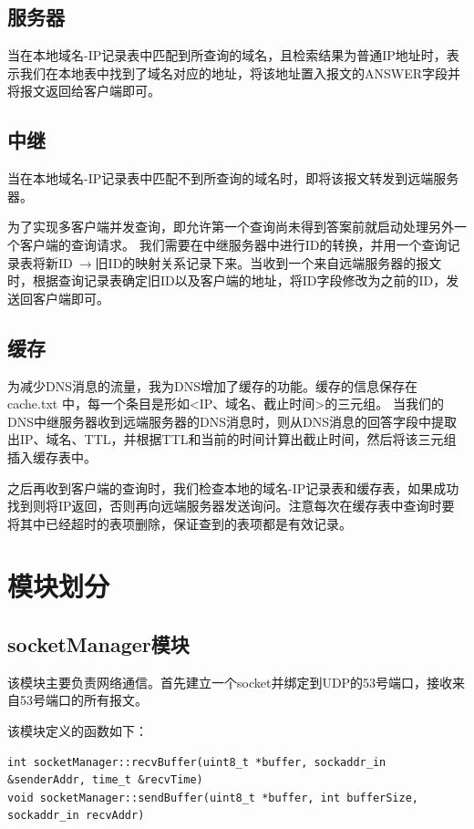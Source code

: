 \documentclass[]{article}
\begin{document}
    \subsection{服务器}
        当在本地域名-IP记录表中匹配到所查询的域名，且检索结果为普通IP地址时，表示我们在本地表中找到了域名对应的地址，将该地址置入报文的ANSWER字段并将报文返回给客户端即可。
    \subsection{中继}
        当在本地域名-IP记录表中匹配不到所查询的域名时，即将该报文转发到远端服务器。

        为了实现多客户端并发查询，即允许第一个查询尚未得到答案前就启动处理另外一个客户端的查询请求。
        我们需要在中继服务器中进行ID的转换，并用一个查询记录表将新ID$\ \to$旧ID的映射关系记录下来。当收到一个来自远端服务器的报文时，根据查询记录表确定旧ID以及客户端的地址，将ID字段修改为之前的ID，发送回客户端即可。
    \subsection{缓存}
        为减少DNS消息的流量，我为DNS增加了缓存的功能。缓存的信息保存在 cache.txt 中，每一个条目是形如<IP、域名、截止时间>的三元组。
        当我们的DNS中继服务器收到远端服务器的DNS消息时，则从DNS消息的回答字段中提取出IP、域名、TTL，并根据TTL和当前的时间计算出截止时间，然后将该三元组插入缓存表中。

        之后再收到客户端的查询时，我们检查本地的域名-IP记录表和缓存表，如果成功找到则将IP返回，否则再向远端服务器发送询问。注意每次在缓存表中查询时要将其中已经超时的表项删除，保证查到的表项都是有效记录。

\section{模块划分}
    \subsection{socketManager模块}
        该模块主要负责网络通信。首先建立一个socket并绑定到UDP的53号端口，接收来自53号端口的所有报文。
        
        该模块定义的函数如下：
        
        \begin{lstlisting}
int socketManager::recvBuffer(uint8_t *buffer, sockaddr_in &senderAddr, time_t &recvTime)
void socketManager::sendBuffer(uint8_t *buffer, int bufferSize, sockaddr_in recvAddr)
        \end{lstlisting}
\end{document}
